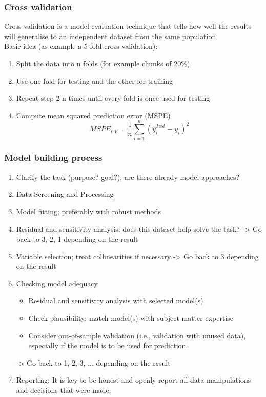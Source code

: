 \subsubsection{Cross validation}
Cross validation is a model evaluation technique that tells how well the results will generalise to an independent dataset from the same population.\\
Basic idea (as example a 5-fold cross validation):
\begin{enumerate}
	\tightlist
	\item Split the data into n folds (for example chunks of 20\%)
	\item Use one fold for testing and the other for training
	\item Repeat step 2 n times until every fold is once used for testing
	\item Compute mean squared prediction error (MSPE)
	\begin{equation*}
		MSPE_{CV}=\frac{1}{n}\sum_{i=1}^{n}(\hat{y}_i^{Test} - y_i)^2
	\end{equation*}
\end{enumerate}

\subsubsection{Model building process}

\begin{enumerate}
	\tightlist
	\item Clarify the task (purpose? goal?); are there already model approaches?
	\item Data Screening and Processing
	\item Model fitting; preferably with robust methods
	\item Residual and sensitivity analysis; does this dataset help solve the task? -> Go back to 3, 2, 1 depending on the result
	\item Variable selection; treat collinearities if necessary -> Go back to 3 depending on the result
	\item Checking model adequacy
	\begin{itemize}
		\tightlist
		\item Residual and sensitivity analysis with selected model(s)
		\item Check plausibility; match model(s) with subject matter expertise
		\item Consider out-of-sample validation (i.e., validation with unused data), especially if the model is to be used for prediction.
	\end{itemize}
	-> Go back to 1, 2, 3, ... depending on the result
	\item Reporting: It is key to be honest and openly report all data manipulations and decisions that were made.
\end{enumerate}

